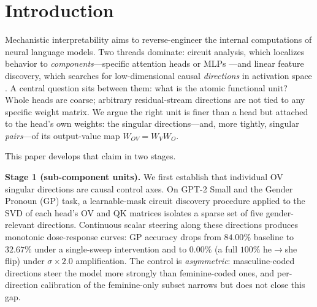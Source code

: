 \section{Introduction}
\label{sec:intro}

Mechanistic interpretability aims to reverse-engineer the internal
computations of neural language models. Two threads dominate: circuit
analysis, which localizes behavior to \emph{components}---specific
attention heads or MLPs
\citep{elhage2021mathematical,wang2023interpretability,conmy2023acdc,meng2022rome}---and
linear feature discovery, which searches for low-dimensional causal
\emph{directions} in activation space
\citep{park2024linearrep,geiger2024das,marks2024geometry,engels2024not,cunningham2023sparse,templeton2024scaling}.
A central question sits between them: what is the atomic functional
unit? Whole heads are coarse; arbitrary residual-stream directions are
not tied to any specific weight matrix. We argue the right unit is
finer than a head but attached to the head's own weights: the singular
directions---and, more tightly, singular \emph{pairs}---of its
output-value map $W_{OV} = W_V W_O$.

This paper develops that claim in two stages.

\textbf{Stage 1 (sub-component units).}
We first establish that individual OV singular directions are causal
control axes. On GPT-2 Small and the Gender Pronoun (GP) task, a
learnable-mask circuit discovery procedure applied to the SVD of each
head's OV and QK matrices isolates a sparse set of five
gender-relevant directions. Continuous scalar steering along these
directions produces monotonic dose-response curves: GP accuracy drops
from $84.00\%$ baseline to $32.67\%$ under a single-sweep intervention
and to $0.00\%$ (a full $100\%$ he$\to$she flip) under $\sigma\times 2.0$
amplification. The control is \emph{asymmetric}: masculine-coded
directions steer the model more strongly than feminine-coded ones, and
per-direction calibration of the feminine-only subset narrows but does
not close this gap.

